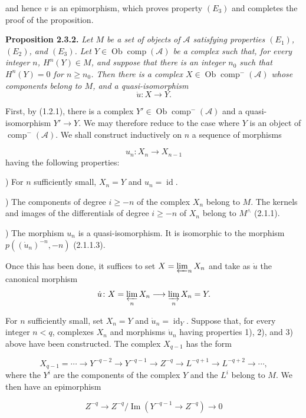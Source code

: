 \clearpage
{}%
\begingroup\small\setlength{\parskip}{0pt}\setlength{\emergencystretch}{1.5em}
\setlength{\abovedisplayskip}{4pt plus 2pt minus 2pt}%
\setlength{\belowdisplayskip}{4pt plus 2pt minus 2pt}%

and hence $v$ is an epimorphism, which proves property $(E_3)$ and completes
the proof of the proposition.

\medskip\noindent\textbf{Proposition 2.3.2.}
\textit{Let $M$ be a set of objects of $\mathcal A$ satisfying properties
$(E_1)$, $(E_2)$, and $(E_3)$. Let
$Y\in\operatorname{Ob}\operatorname{comp}(\mathcal A)$ be a complex such
that, for every integer $n$, $H^n(Y)\in M$, and suppose that there is an
integer $n_0$ such that $H^n(Y)=0$ for $n\geq n_0$. Then there is a complex
$X\in\operatorname{Ob}\operatorname{comp}^{-}(\mathcal A)$ whose components
belong to $M$, and a quasi-isomorphism}
\[
\dot u\colon X\longrightarrow Y.
\]

First, by (1.2.1), there is a complex
$Y'\in\operatorname{Ob}\operatorname{comp}^{-}(\mathcal A)$ and a
quasi-isomorphism $Y'\longrightarrow Y$. We may therefore reduce to the case
where $Y$ is an object of $\operatorname{comp}^{-}(\mathcal A)$. We shall
construct inductively on $n$ a sequence of morphisms

\[
u_n\colon X_n\longrightarrow X_{n-1}
\]
having the following properties:

) For $n$ sufficiently small, $X_n=Y$ and
$u_n=\operatorname{id}$.

) The components of degree $i\geq -n$ of the complex $X_n$ belong
to $M$. The kernels and images of the differentials of degree $i\geq -n$ of
$X_n$ belong to $M^\wedge$ (2.1.1).

) The morphism $u_n$ is a quasi-isomorphism. It is isomorphic to
the morphism $p((\dot u_n)^{-n},-n)$ (2.1.1.3).

Once this has been done, it suffices to set $X=\varprojlim_n X_n$ and take
as $\dot u$ the canonical morphism
\[
\dot u\colon X=\varprojlim_n X_n\longrightarrow\varinjlim_n X_n=Y.
\]

For $n$ sufficiently small, set $X_n=Y$ and
$\dot u_n=\operatorname{id}_Y$. Suppose that, for every integer $n<q$,
complexes $X_n$ and morphisms $\dot u_n$ having properties 1), 2), and 3) above
have been constructed. The complex $X_{q-1}$ has the form

\[
X_{q-1}=\cdots\longrightarrow Y^{-q-2}\longrightarrow Y^{-q-1}
\longrightarrow Z^{-q}\longrightarrow L^{-q+1}\longrightarrow L^{-q+2}
\longrightarrow\cdots,
\]
where the $Y^i$ are the components of the complex $Y$ and the $L^i$ belong
to $M$. We then have an epimorphism

\[
Z^{-q}\longrightarrow
Z^{-q}/\operatorname{Im}(Y^{-q-1}\longrightarrow Z^{-q})
\longrightarrow0
\]
\endgroup
